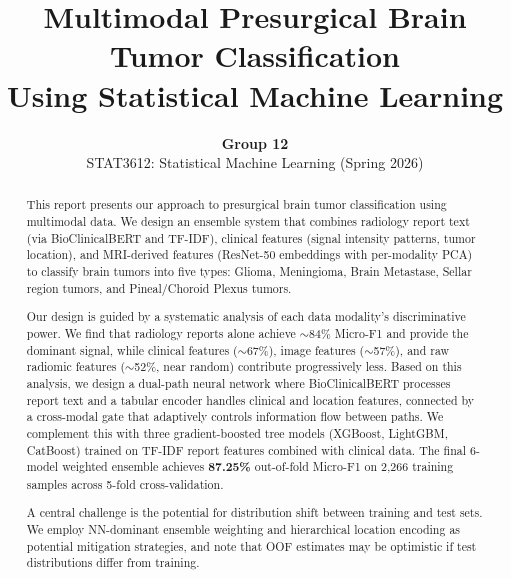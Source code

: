 \documentclass[11pt,a4paper]{article}
\title{
  \vspace{-1cm}
  \LARGE\textbf{Multimodal Presurgical Brain Tumor Classification\\
  Using Statistical Machine Learning}
  \vspace{0.3cm}
}
\author{
  \textbf{Group 12} \\
  STAT3612: Statistical Machine Learning (Spring 2026)
}
\date{}
\newcommand{\best}[1]{\textbf{#1}}
\begin{document}
\maketitle
\thispagestyle{empty}

\begin{abstract}
This report presents our approach to presurgical brain tumor classification using multimodal data. We design an ensemble system that combines radiology report text (via BioClinicalBERT and TF-IDF), clinical features (signal intensity patterns, tumor location), and MRI-derived features (ResNet-50 embeddings with per-modality PCA) to classify brain tumors into five types: Glioma, Meningioma, Brain Metastase, Sellar region tumors, and Pineal/Choroid Plexus tumors.

Our design is guided by a systematic analysis of each data modality's discriminative power. We find that radiology reports alone achieve $\sim$84\% Micro-F1 and provide the dominant signal, while clinical features ($\sim$67\%), image features ($\sim$57\%), and raw radiomic features ($\sim$52\%, near random) contribute progressively less. Based on this analysis, we design a dual-path neural network where BioClinicalBERT processes report text and a tabular encoder handles clinical and location features, connected by a cross-modal gate that adaptively controls information flow between paths. We complement this with three gradient-boosted tree models (XGBoost, LightGBM, CatBoost) trained on TF-IDF report features combined with clinical data. The final 6-model weighted ensemble achieves \best{87.25\%} out-of-fold Micro-F1 on 2,266 training samples across 5-fold cross-validation.

A central challenge is the potential for distribution shift between training and test sets. We employ NN-dominant ensemble weighting and hierarchical location encoding as potential mitigation strategies, and note that OOF estimates may be optimistic if test distributions differ from training.
\end{abstract}

\tableofcontents
\newpage




\end{document}
